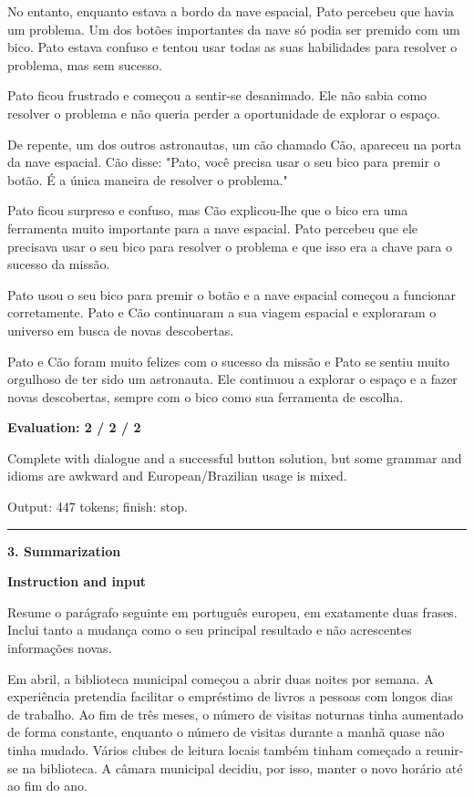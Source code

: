 \documentclass[10pt]{article}
\begin{document}
{\begin{minipage}{\textwidth}
No entanto, enquanto estava a bordo da nave espacial, Pato percebeu que havia um problema. Um dos botões importantes da nave só podia ser premido com um bico. Pato estava confuso e tentou usar todas as suas habilidades para resolver o problema, mas sem sucesso.
\par\smallskip
Pato ficou frustrado e começou a sentir-se desanimado. Ele não sabia como resolver o problema e não queria perder a oportunidade de explorar o espaço.
\par\smallskip
De repente, um dos outros astronautas, um cão chamado Cão, apareceu na porta da nave espacial. Cão disse: "Pato, você precisa usar o seu bico para premir o botão. É a única maneira de resolver o problema."
\par\smallskip
Pato ficou surpreso e confuso, mas Cão explicou-lhe que o bico era uma ferramenta muito importante para a nave espacial. Pato percebeu que ele precisava usar o seu bico para resolver o problema e que isso era a chave para o sucesso da missão.
\par\smallskip
Pato usou o seu bico para premir o botão e a nave espacial começou a funcionar corretamente. Pato e Cão continuaram a sua viagem espacial e exploraram o universo em busca de novas descobertas.
\par\smallskip
Pato e Cão foram muito felizes com o sucesso da missão e Pato se sentiu muito orgulhoso de ter sido um astronauta. Ele continuou a explorar o espaço e a fazer novas descobertas, sempre com o bico como sua ferramenta de escolha.\par\smallskip
\textbf{Evaluation: 2 / 2 / 2}\par Complete with dialogue and a successful button solution, but some grammar and idioms are awkward and European/Brazilian usage is mixed.
\par {\color{gray} Output: 447 tokens; finish: stop.}\par
\medskip\hrule\smallskip
{\bfseries 3. Summarization}\par\smallskip
\textbf{Instruction and input}\par Resume o parágrafo seguinte em português europeu, em exatamente duas frases. Inclui tanto a mudança como o seu principal resultado e não acrescentes informações novas.
\par\smallskip
Em abril, a biblioteca municipal começou a abrir duas noites por semana. A experiência pretendia facilitar o empréstimo de livros a pessoas com longos dias de trabalho. Ao fim de três meses, o número de visitas noturnas tinha aumentado de forma constante, enquanto o número de visitas durante a manhã quase não tinha mudado. Vários clubes de leitura locais também tinham começado a reunir-se na biblioteca. A câmara municipal decidiu, por isso, manter o novo horário até ao fim do ano.\par\smallskip

\end{minipage}}
\end{document}
